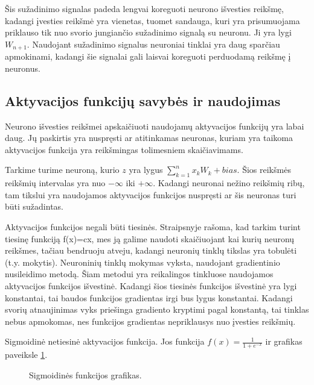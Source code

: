Šis sužadinimo signalas padeda lengvai koreguoti neurono išvesties reikšmę, kadangi įvesties reikšmė yra vienetas, tuomet sandauga, kuri yra prisumuojama priklauso tik nuo svorio jungiančio sužadinimo signalą su neuronu. Ji yra lygi  $W_{n+1}$. Naudojant sužadinimo signalus neuroniai tinklai yra daug sparčiau apmokinami, kadangi šie signalai gali laisvai koreguoti perduodamą reikšmę į neuronus.
  \subsection{Aktyvacijos funkcijų savybės ir naudojimas}
Neurono išvesties reikšmei apskaičiuoti naudojamų aktyvacijos funkcijų yra labai daug. Jų paskirtis yra nuspręsti ar atitinkamas neuronas, kuriam yra taikoma aktyvacijos funkcija yra reikšmingas tolimesniem skaičiavimams.

Tarkime turime neuroną, kurio $z$ yra lygus $\sum_{k=1}^{n} x_k W_k + bias$. Šios reikšmės reikšmių intervalas yra nuo $-\infty$ iki $+\infty$. Kadangi neuronai nežino reikšmių ribų, tam tikslui yra naudojamos aktyvacijos funkcijos nuspręsti ar šis neuronas turi būti sužadintas.

Aktyvacijos funkcijos negali būti tiesinės. Straipsnyje rašoma, kad tarkim turint tiesinę funkciją f(x)=cx, mes ją galime naudoti skaičiuojant kai kurių neuronų reikšmes, tačiau bendruoju atveju, kadangi neuronių tinklų tikslas yra tobulėti (t.y. mokytis). Neuroninių tinklų mokymas vyksta, naudojant gradientinio nusileidimo metodą. Šiam metodui yra reikalingos tinkluose naudojamos aktyvacijos funkcijos išvestinė. Kadangi šios tiesinės funkcijos išvestinė yra lygi konstantai, tai baudos funkcijos gradientas irgi bus lygus konstantai. Kadangi svorių atnaujinimas vyks priešinga gradiento kryptimi pagal konstantą, tai tinklas nebus apmokomas, nes funkcijos gradientas nepriklausys nuo įvesties reikšmių. \cite{Avinash2017}

Sigmoidinė netiesinė aktyvacijos funkcija. Jos funkcija $f(x)=\frac{1}{1+e^{-x}}$ ir grafikas paveiksle \ref{fig:sigmoid}.
\begin{figure}[h!]
  \centering
{}
\caption{Sigmoidinės funkcijos grafikas.}
\label{fig:sigmoid}
\end{figure}

